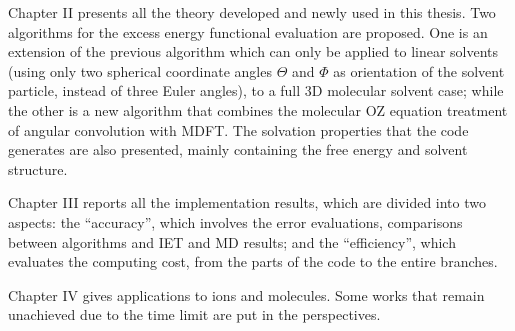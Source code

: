 Chapter II presents all the theory developed and newly used in this
thesis. Two algorithms for the excess energy functional evaluation
are proposed. One is an extension of the previous algorithm which
can only be applied to linear solvents (using only two spherical coordinate
angles $\Theta$ and $\Phi$ as orientation of the solvent particle,
instead of three Euler angles), to a full 3D molecular solvent case;
while the other is a new algorithm that combines the molecular \acs{OZ}
equation treatment of angular convolution with \acs{MDFT}. The solvation
properties that the code generates are also presented, mainly containing
the free energy and solvent structure.

Chapter III reports all the implementation results, which are divided
into two aspects: the ``accuracy'', which involves the error evaluations,
comparisons between algorithms and \acs{IET} and \acs{MD} results;
and the ``efficiency'', which evaluates the computing cost, from
the parts of the code to the entire branches.

Chapter IV gives applications to ions and molecules. Some works that
remain unachieved due to the time limit are put in the perspectives.
